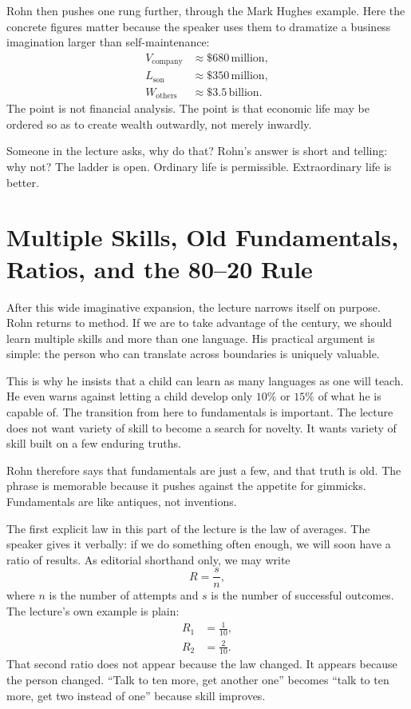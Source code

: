 Rohn then pushes one rung further, through the Mark Hughes example. Here the concrete figures matter because the speaker uses them to dramatize a business imagination larger than self-maintenance:
\begin{align}
V_{\mathrm{company}} &\approx \$680\,\text{million}, \\
L_{\mathrm{son}} &\approx \$350\,\text{million}, \\
W_{\mathrm{others}} &\approx \$3.5\,\text{billion}.
\end{align}
The point is not financial analysis. The point is that economic life may be ordered so as to create wealth outwardly, not merely inwardly.

Someone in the lecture asks, why do that? Rohn's answer is short and telling: why not? The ladder is open. Ordinary life is permissible. Extraordinary life is better.

\section{Multiple Skills, Old Fundamentals, Ratios, and the 80--20 Rule}

After this wide imaginative expansion, the lecture narrows itself on purpose. Rohn returns to method. If we are to take advantage of the century, we should learn multiple skills and more than one language. His practical argument is simple: the person who can translate across boundaries is uniquely valuable.

This is why he insists that a child can learn as many languages as one will teach. He even warns against letting a child develop only \(10\%\) or \(15\%\) of what he is capable of. The transition from here to fundamentals is important. The lecture does not want variety of skill to become a search for novelty. It wants variety of skill built on a few enduring truths.

Rohn therefore says that fundamentals are just a few, and that truth is old. The phrase is memorable because it pushes against the appetite for gimmicks. Fundamentals are like antiques, not inventions.

The first explicit law in this part of the lecture is the law of averages. The speaker gives it verbally: if we do something often enough, we will soon have a ratio of results. As editorial shorthand only, we may write
\begin{equation}
R=\frac{s}{n},
\end{equation}
where \(n\) is the number of attempts and \(s\) is the number of successful outcomes. The lecture's own example is plain:
\begin{align}
R_1 &= \frac{1}{10}, \\
R_2 &= \frac{2}{10}.
\end{align}
That second ratio does not appear because the law changed. It appears because the person changed. ``Talk to ten more, get another one'' becomes ``talk to ten more, get two instead of one'' because skill improves.

